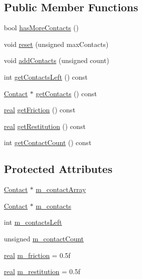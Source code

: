 \subsection*{Public Member Functions}
\begin{DoxyCompactItemize}
\item 
bool \hyperlink{classrum_1_1_collision_data_acbe7735f5186b368900f7c68ca2d7b4f}{has\+More\+Contacts} ()
\item 
void \hyperlink{classrum_1_1_collision_data_ae49fabbf40a855eab3ce0003aa418253}{reset} (unsigned max\+Contacts)
\item 
void \hyperlink{classrum_1_1_collision_data_a6774145a5f81c49c30c5d0c7954d35d5}{add\+Contacts} (unsigned count)
\item 
int \hyperlink{classrum_1_1_collision_data_a2b3dcbec102ae7affab46ba19c7c4eb7}{get\+Contacts\+Left} () const
\item 
\hyperlink{classrum_1_1_contact}{Contact} $\ast$ \hyperlink{classrum_1_1_collision_data_a0b9d69450fbefbb28b0d427793cccc26}{get\+Contacts} () const
\item 
\hyperlink{namespacerum_a7e8cca23573d5eaead0f138cbaa4862c}{real} \hyperlink{classrum_1_1_collision_data_a917290357ac710e3d4e1bfce4d040495}{get\+Friction} () const
\item 
\hyperlink{namespacerum_a7e8cca23573d5eaead0f138cbaa4862c}{real} \hyperlink{classrum_1_1_collision_data_aae54080198ebe0e4700142f0ad03b344}{get\+Restitution} () const
\item 
int \hyperlink{classrum_1_1_collision_data_a77b0f7209d6709f8a2041722428f56d5}{get\+Contact\+Count} () const
\end{DoxyCompactItemize}
\subsection*{Protected Attributes}
\begin{DoxyCompactItemize}
\item 
\hyperlink{classrum_1_1_contact}{Contact} $\ast$ \hyperlink{classrum_1_1_collision_data_a81c91a3b806491ce9a6c2b458e10cee6}{m\+\_\+contact\+Array}
\item 
\hyperlink{classrum_1_1_contact}{Contact} $\ast$ \hyperlink{classrum_1_1_collision_data_a4328ce35ae3759b3ca313177bb561ef0}{m\+\_\+contacts}
\item 
int \hyperlink{classrum_1_1_collision_data_a037132e6e4f65c885f1d29da338df4af}{m\+\_\+contacts\+Left}
\item 
unsigned \hyperlink{classrum_1_1_collision_data_a17225794f1a582d0d5c5565ffc3334ff}{m\+\_\+contact\+Count}
\item 
\hyperlink{namespacerum_a7e8cca23573d5eaead0f138cbaa4862c}{real} \hyperlink{classrum_1_1_collision_data_a752a7564c13eeff1a03b6552238f6a00}{m\+\_\+friction} = 0.\+5f
\item 
\hyperlink{namespacerum_a7e8cca23573d5eaead0f138cbaa4862c}{real} \hyperlink{classrum_1_1_collision_data_ab28c985d5b8554f548a485cac367c1fd}{m\+\_\+restitution} = 0.\+5f
\end{DoxyCompactItemize}


